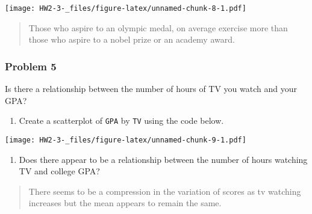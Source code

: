 \documentclass[]{article}
\newenvironment{Shaded}{\begin{snugshade}}{\end{snugshade}}
\newcommand{\KeywordTok}[1]{\textcolor[rgb]{0.13,0.29,0.53}{\textbf{#1}}}
\newcommand{\NormalTok}[1]{#1}
\newcommand{\OperatorTok}[1]{\textcolor[rgb]{0.81,0.36,0.00}{\textbf{#1}}}
\providecommand{\tightlist}{%
  \setlength{\itemsep}{0pt}\setlength{\parskip}{0pt}}
\begin{document}
\begin{Shaded}
\end{Shaded}

\texttt{[image: HW2-3-\_files/figure-latex/unnamed-chunk-8-1.pdf]}

\begin{quote}
Those who aspire to an olympic medal, on average exercise more than
those who aspire to a nobel prize or an academy award.
\end{quote}

\hypertarget{problem-5}{%
\subsubsection{Problem 5}\label{problem-5}}

Is there a relationship between the number of hours of TV you watch and
your GPA?

\begin{enumerate}
\def\labelenumi{\alph{enumi})}
\tightlist
\item
  Create a scatterplot of \texttt{GPA} by \texttt{TV} using the code
  below.
\end{enumerate}

\begin{Shaded}
\end{Shaded}

\texttt{[image: HW2-3-\_files/figure-latex/unnamed-chunk-9-1.pdf]}

\begin{enumerate}
\def\labelenumi{\alph{enumi})}
\setcounter{enumi}{1}
\tightlist
\item
  Does there appear to be a relationship between the number of hours
  watching TV and college GPA?
\end{enumerate}

\begin{quote}
There seems to be a compression in the variation of scores as tv
watching increases but the mean appears to remain the same.
\end{quote}
\end{document}
